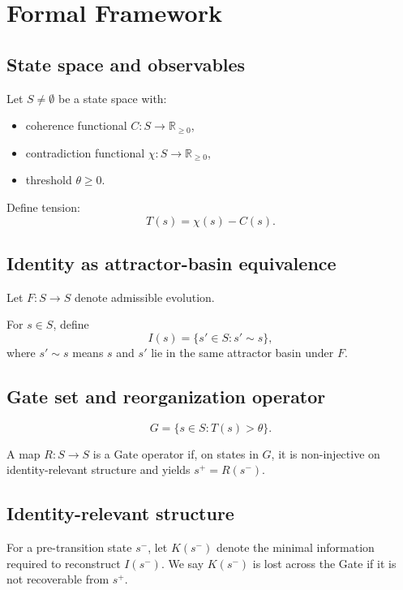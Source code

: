 \documentclass[12pt]{article}
\begin{document}
\section{Formal Framework}

\subsection{State space and observables}

Let $S \neq \emptyset$ be a state space with:
\begin{itemize}
\item coherence functional $C : S \to \mathbb{R}_{\ge 0}$,
\item contradiction functional $\chi : S \to \mathbb{R}_{\ge 0}$,
\item threshold $\theta \ge 0$.
\end{itemize}

Define tension:
\[
T(s) = \chi(s) - C(s).
\]

\subsection{Identity as attractor-basin equivalence}

Let $F : S \to S$ denote admissible evolution.

\begin{definition}
For $s \in S$, define
\[
I(s) = \{ s' \in S : s' \sim s \},
\]
where $s' \sim s$ means $s$ and $s'$ lie in the same attractor basin under $F$.
\end{definition}

\subsection{Gate set and reorganization operator}

\[
G = \{ s \in S : T(s) > \theta \}.
\]

\begin{definition}
A map $R : S \to S$ is a Gate operator if, on states in $G$, it is non-injective on identity-relevant structure and yields $s^+ = R(s^-)$.
\end{definition}

\subsection{Identity-relevant structure}

\begin{definition}
For a pre-transition state $s^-$, let $K(s^-)$ denote the minimal information required to reconstruct $I(s^-)$. We say $K(s^-)$ is lost across the Gate if it is not recoverable from $s^+$.
\end{definition}
\end{document}
